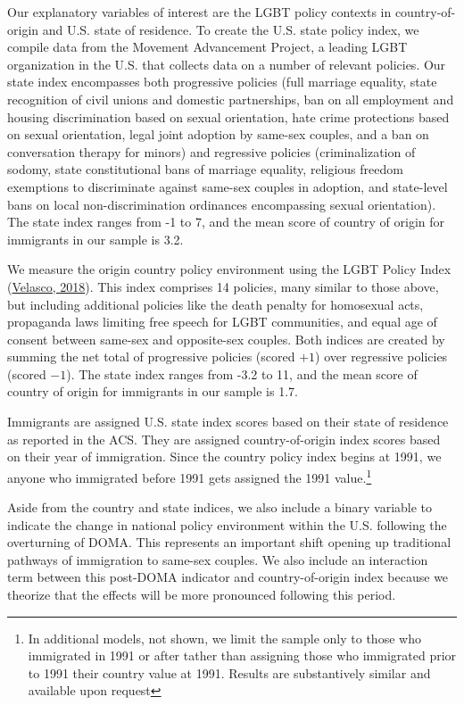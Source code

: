 \documentclass[
  11pt,
]{article}
\begin{document}
Our explanatory variables of interest are the LGBT policy contexts in country-of-origin and U.S. state of residence. To create the U.S. state policy index, we compile data from the Movement Advancement Project, a leading LGBT organization in the U.S. that collects data on a number of relevant policies. Our state index encompasses both progressive policies (full marriage equality, state recognition of civil unions and domestic partnerships, ban on all employment and housing discrimination based on sexual orientation, hate crime protections based on sexual orientation, legal joint adoption by same-sex couples, and a ban on conversation therapy for minors) and regressive policies (criminalization of sodomy, state constitutional bans of marriage equality, religious freedom exemptions to discriminate against same-sex couples in adoption, and state-level bans on local non-discrimination ordinances encompassing sexual orientation). The state index ranges from -1 to 7, and the mean score of country of origin for immigrants in our sample is 3.2.

We measure the origin country policy environment using the LGBT Policy Index (\protect\hyperlink{ref-velasco_2018}{Velasco, 2018}). This index comprises 14 policies, many similar to those above, but including additional policies like the death penalty for homosexual acts, propaganda laws limiting free speech for LGBT communities, and equal age of consent between same-sex and opposite-sex couples. Both indices are created by summing the net total of progressive policies (scored \(+1\)) over regressive policies (scored \(-1\)). The state index ranges from -3.2 to 11, and the mean score of country of origin for immigrants in our sample is 1.7.

Immigrants are assigned U.S. state index scores based on their state of residence as reported in the ACS. They are assigned country-of-origin index scores based on their year of immigration. Since the country policy index begins at 1991, we anyone who immigrated before 1991 gets assigned the 1991 value.\footnote{In additional models, not shown, we limit the sample only to those who immigrated in 1991 or after tather than assigning those who immigrated prior to 1991 their country value at 1991. Results are substantively similar and available upon request}

Aside from the country and state indices, we also include a binary variable to indicate the change in national policy environment within the U.S. following the overturning of DOMA. This represents an important shift opening up traditional pathways of immigration to same-sex couples. We also include an interaction term between this post-DOMA indicator and country-of-origin index because we theorize that the effects will be more pronounced following this period.
\end{document}
